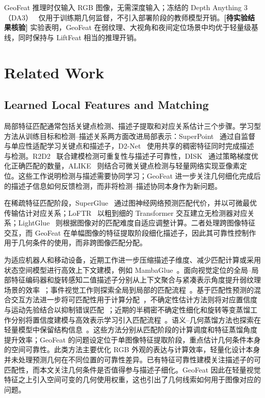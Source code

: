 \documentclass{article}
\begin{document}
GeoFeat 推理时仅输入 RGB 图像，无需深度输入；冻结的 Depth Anything 3（DA3）~\cite{Lin2025DepthAnything3} 仅用于训练期几何监督，不引入部署阶段的教师模型开销。\textbf{[待实验结果核验]} 实验表明，GeoFeat 在弱纹理、大视角和夜间定位场景中均优于轻量级基线，同时保持与 LiftFeat 相当的推理开销。

\section{Related Work}

\subsection{Learned Local Features and Matching}
局部特征匹配通常包括关键点检测、描述子提取和对应关系估计三个步骤。学习型方法从训练目标和检测--描述关系两方面改进局部表示：SuperPoint~\cite{DeTone2018SuperPoint} 通过自监督与单应性适配学习关键点和描述子，D2-Net~\cite{Dusmanu2019D2Net} 使用共享的稠密特征同时完成描述与检测。R2D2~\cite{Revaud2019R2D2} 联合建模检测可重复性与描述子可靠性，DISK~\cite{Tyszkiewicz2020DISK} 通过策略梯度优化正确匹配的数量，ALIKE~\cite{Zhao2023ALIKE} 则结合可微关键点检测与轻量网络实现亚像素定位。这些工作说明检测与描述需要协同学习；GeoFeat 进一步关注几何细化完成后的描述子信息如何反馈检测，而非将检测--描述协同本身作为新问题。

在稀疏特征匹配阶段，SuperGlue~\cite{Sarlin2020SuperGlue} 通过图神经网络预测匹配代价，并以可微最优传输估计对应关系；LoFTR~\cite{Sun2021LoFTR} 以粗到细的 Transformer 交互建立无检测器对应关系；LightGlue~\cite{Lindenberger2023LightGlue} 则根据图像对的匹配难度自适应调整计算。二者处理跨图像特征交互，而 GeoFeat 在单幅图像的特征提取阶段细化描述子，因此其可靠性控制作用于几何条件的使用，而非跨图像匹配分配。

为适应机器人和移动设备，近期工作进一步压缩描述子维度、减少匹配计算或采用状态空间模型进行高效上下文建模，例如 MambaGlue~\cite{MambaGlue2025}。面向视觉定位的全局--局部特征编码器和旋转感知二值描述子分别从上下文聚合与紧凑表示角度提升弱纹理场景的效率~\cite{Chen2026GLAFE,Yao2026RotationBinary}；事件视觉工作则探索全局到局部的匹配流程~\cite{Hines2026EventGeM}。基于匹配性预测的混合交互方法进一步将可匹配性用于计算分配~\cite{Lu2026Matchability}，不确定性估计方法则将对应置信度与运动先验结合以抑制错误匹配~\cite{Huang2026CUEMP}；近期的半稠密不确定性细化和旋转等变蒸馏工作分别将置信度建模与高效表示学习引入匹配流程~\cite{Li2026SURE,Ge2026REDIMatch}。语义--几何蒸馏方法也探索在轻量模型中保留结构信息~\cite{Shi2026SemLight}。这些方法分别从匹配阶段的计算调度和特征蒸馏角度提升效率；GeoFeat 的问题设定位于单图像特征提取阶段，重点估计几何条件本身的空间可靠性。此类方法主要优化 RGB 外观的表达与计算效率，轻量化设计本身并未处理预测几何在不同位置的可靠性差异。已有特征可靠性建模关注描述子的可匹配性，而本文关注几何条件是否值得参与描述子细化。GeoFeat 因此在轻量视觉特征之上引入空间可变的几何使用权重，这也引出了几何线索如何用于图像对应的问题。
\end{document}
